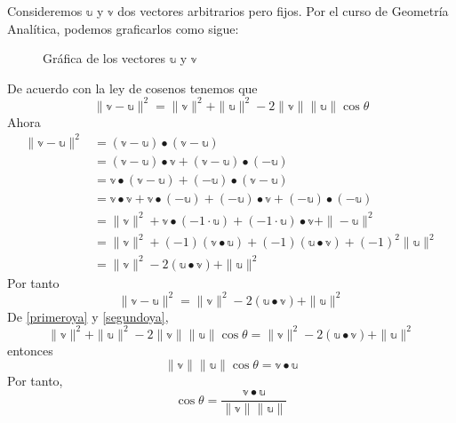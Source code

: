 Consideremos $\mathbb{u}$ y $\mathbb{v}$ dos vectores arbitrarios pero fijos. Por el curso de Geometría Analítica, podemos graficarlos como sigue:
\begin{figure}[h!]
    \centering
    \caption{Gráfica de los vectores $\mathbb{u}$ y $\mathbb{v}$}
\end{figure}

De acuerdo con la ley de cosenos tenemos que
\begin{equation}
    \| \mathbb{v} - \mathbb{u} \|^2 = \| \mathbb{v} \|^2 + \| \mathbb{u} \|^2 - 2 \| \mathbb{v} \| \| \mathbb{u} \| \cos \theta \label{primeroya}
\end{equation}
Ahora
\begin{align*}
    \| \mathbb{v} - \mathbb{u} \|^2 & = (\mathbb{v} - \mathbb{u}) \bullet (\mathbb{v} - \mathbb{u}) \\
    & = (\mathbb{v} - \mathbb{u}) \bullet \mathbb{v} + (\mathbb{v} - \mathbb{u}) \bullet (-\mathbb{u}) \\
    & = \mathbb{v} \bullet (\mathbb{v} - \mathbb{u}) + (-\mathbb{u}) \bullet (\mathbb{v} - \mathbb{u}) \\
    & = \mathbb{v} \bullet \mathbb{v} + \mathbb{v} \bullet (-\mathbb{u}) + (-\mathbb{u}) \bullet \mathbb{v} + (-\mathbb{u}) \bullet (-\mathbb{u}) \\
    & = \| \mathbb{v} \|^2 + \mathbb{v} \bullet (-1 \cdot \mathbb{u}) + (-1 \cdot \mathbb{u}) \bullet \mathbb{v} + \| - \mathbb{u} \|^2 \\
    & = \| \mathbb{v} \|^2 + (-1) (\mathbb{v} \bullet \mathbb{u}) + (-1)(\mathbb{u} \bullet \mathbb{v}) + (-1)^2 \| \mathbb{u} \|^2 \\
    & = \| \mathbb{v} \|^2 - 2(\mathbb{u} \bullet \mathbb{v}) + \| \mathbb{u} \|^2
\end{align*}
Por tanto
\begin{equation}
    \| \mathbb{v} - \mathbb{u} \|^2 = \| \mathbb{v} \|^2 - 2(\mathbb{u} \bullet \mathbb{v}) + \| \mathbb{u} \|^2 \label{segundoya}
\end{equation}
De \eqref{primeroya} y \eqref{segundoya},
$$\| \mathbb{v} \|^2 + \| \mathbb{u} \|^2 - 2 \| \mathbb{v} \| \| \mathbb{u} \| \cos \theta = \| \mathbb{v} \|^2 - 2(\mathbb{u} \bullet \mathbb{v}) + \| \mathbb{u} \|^2$$\newpage\noindent
entonces
$$\| \mathbb{v} \| \| \mathbb{u} \| \cos \theta = \mathbb{v} \bullet \mathbb{u}$$
Por tanto,
\begin{equation}
    \cos \theta = \frac{\mathbb{v} \bullet \mathbb{u}}{\| \mathbb{v} \| \| \mathbb{u} \|}
\end{equation}

